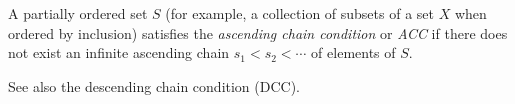 \documentclass[12pt]{article}
\begin{document}
A partially ordered set $S$ (for example, a collection of subsets of a set $X$ when ordered by inclusion) satisfies the {\it ascending chain condition} or {\it ACC} if there does not exist an infinite ascending chain $s_1 < s_2 < \cdots$ of elements of $S$.

See also the descending chain condition (DCC).
\end{document}
